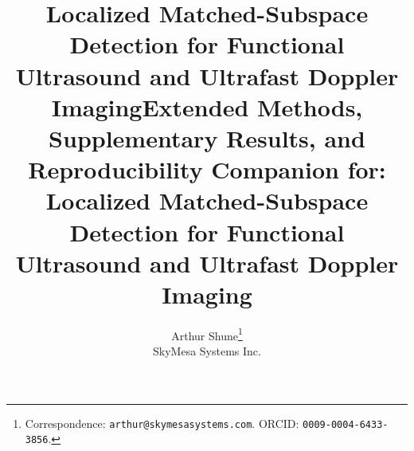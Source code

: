 \documentclass[11pt]{article}
\newif\ifPAPERONLY
\newif\ifSUPPLEMENTONLY
\begin{document}
\setlength{\emergencystretch}{1em}

\ifSUPPLEMENTONLY
\title{Supplementary Material: Localized Matched-Subspace Detection for Functional Ultrasound and Ultrafast Doppler Imaging}
\else\ifPAPERONLY
\title{Localized Matched-Subspace Detection for Functional Ultrasound and Ultrafast Doppler Imaging}
\else
\title{Extended Methods, Supplementary Results, and Reproducibility Companion for: Localized Matched-Subspace Detection for Functional Ultrasound and Ultrafast Doppler Imaging}
\fi\fi
\author{Arthur Shune\thanks{Correspondence: \texttt{arthur@skymesasystems.com}. ORCID: \texttt{0009-0004-6433-3856}.}\\
\small SkyMesa Systems Inc.}
\date{}
\maketitle
\end{document}

